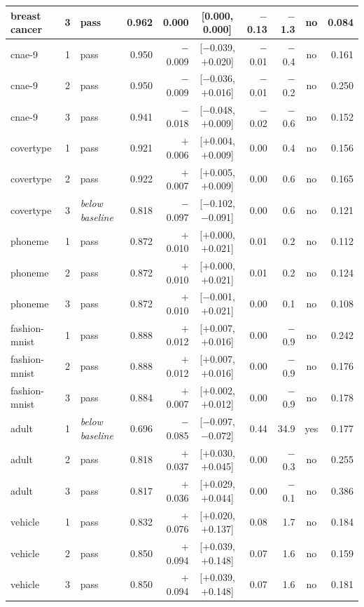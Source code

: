 {\begin{longtable}{lcl rrc rrcr}
breast cancer & 3 & pass & 0.962 & 0.000 & [0.000, 0.000] & $-$0.13 & $-$1.3 & no & 0.084 \\
\midrule
cnae-9 & 1 & pass & 0.950 & $-$0.009 & [$-$0.039, $+$0.020] & $-$0.01 & $-$0.4 & no & 0.161 \\
cnae-9 & 2 & pass & 0.950 & $-$0.009 & [$-$0.036, $+$0.016] & $-$0.01 & $-$0.2 & no & 0.250 \\
cnae-9 & 3 & pass & 0.941 & $-$0.018 & [$-$0.048, $+$0.009] & $-$0.02 & $-$0.6 & no & 0.152 \\
\midrule
covertype & 1 & pass & 0.921 & $+$0.006 & [$+$0.004, $+$0.009] & 0.00 & 0.4 & no & 0.156 \\
covertype & 2 & pass & 0.922 & $+$0.007 & [$+$0.005, $+$0.009] & 0.00 & 0.6 & no & 0.165 \\
covertype & 3 & \emph{below baseline} & 0.818 & $-$0.097 & [$-$0.102, $-$0.091] & 0.00 & 0.6 & no & 0.121 \\
\midrule
phoneme & 1 & pass & 0.872 & $+$0.010 & [$+$0.000, $+$0.021] & 0.01 & 0.2 & no & 0.112 \\
phoneme & 2 & pass & 0.872 & $+$0.010 & [$+$0.000, $+$0.021] & 0.01 & 0.2 & no & 0.124 \\
phoneme & 3 & pass & 0.872 & $+$0.010 & [$-$0.001, $+$0.021] & 0.00 & 0.1 & no & 0.108 \\
\midrule
fashion-mnist & 1 & pass & 0.888 & $+$0.012 & [$+$0.007, $+$0.016] & 0.00 & $-$0.9 & no & 0.242 \\
fashion-mnist & 2 & pass & 0.888 & $+$0.012 & [$+$0.007, $+$0.016] & 0.00 & $-$0.9 & no & 0.176 \\
fashion-mnist & 3 & pass & 0.884 & $+$0.007 & [$+$0.002, $+$0.012] & 0.00 & $-$0.9 & no & 0.178 \\
\midrule
adult & 1 & \emph{below baseline} & 0.696 & $-$0.085 & [$-$0.097, $-$0.072] & 0.44 & 34.9 & yes & 0.177 \\
adult & 2 & pass & 0.818 & $+$0.037 & [$+$0.030, $+$0.045] & 0.00 & $-$0.3 & no & 0.255 \\
adult & 3 & pass & 0.817 & $+$0.036 & [$+$0.029, $+$0.044] & 0.00 & $-$0.1 & no & 0.386 \\
\midrule
vehicle & 1 & pass & 0.832 & $+$0.076 & [$+$0.020, $+$0.137] & 0.08 & 1.7 & no & 0.184 \\
vehicle & 2 & pass & 0.850 & $+$0.094 & [$+$0.039, $+$0.148] & 0.07 & 1.6 & no & 0.159 \\
vehicle & 3 & pass & 0.850 & $+$0.094 & [$+$0.039, $+$0.148] & 0.07 & 1.6 & no & 0.181 \\

\end{longtable}}
